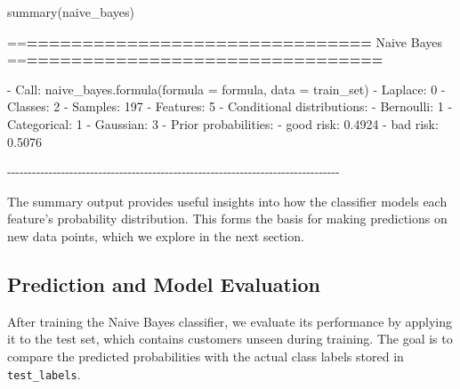 \documentclass[
  11pt,
]{book}
\makeatletter
\newenvironment{Shaded}{}{}
\newcommand{\AttributeTok}[1]{#1}
\newcommand{\DecValTok}[1]{#1}
\newcommand{\ErrorTok}[1]{\textcolor[rgb]{0.21,0.21,0.21}{\textbf{#1}}}
\newcommand{\FloatTok}[1]{#1}
\newcommand{\FunctionTok}[1]{#1}
\newcommand{\NormalTok}[1]{#1}
\newcommand{\SpecialCharTok}[1]{\textcolor[rgb]{0.39,0.39,0.39}{#1}}
\newenvironment{kframe}{%
\medskip{}
\setlength{\fboxsep}{.8em}
 \def\at@end@of@kframe{}%
 \ifinner\ifhmode%
  \def\at@end@of@kframe{\end{minipage}}%
  \begin{minipage}{\columnwidth}%
 \fi\fi%
 \def\FrameCommand##1{\hskip\@totalleftmargin \hskip-\fboxsep
 \colorbox{shadecolor}{##1}\hskip-\fboxsep
     \hskip-\linewidth \hskip-\@totalleftmargin \hskip\columnwidth}%
 \MakeFramed {\advance\hsize-\width
   \@totalleftmargin\z@ \linewidth\hsize
   \@setminipage}}%
 {\par\unskip\endMakeFramed%
 \at@end@of@kframe}
\renewenvironment{Shaded}{\begin{kframe}}{\end{kframe}}
\theoremstyle{definition}
\theoremstyle{definition}
\theoremstyle{definition}
\theoremstyle{definition}
\theoremstyle{remark}
\makeatother
\begin{document}
\begin{Shaded}
\begin{Highlighting}[]
\FunctionTok{summary}\NormalTok{(naive\_bayes)}
   
   \SpecialCharTok{==}\ErrorTok{===============================}\NormalTok{ Naive Bayes }\SpecialCharTok{==}\ErrorTok{================================} 
    
   \SpecialCharTok{{-}}\NormalTok{ Call}\SpecialCharTok{:} \FunctionTok{naive\_bayes.formula}\NormalTok{(}\AttributeTok{formula =}\NormalTok{ formula, }\AttributeTok{data =}\NormalTok{ train\_set) }
   \SpecialCharTok{{-}}\NormalTok{ Laplace}\SpecialCharTok{:} \DecValTok{0} 
   \SpecialCharTok{{-}}\NormalTok{ Classes}\SpecialCharTok{:} \DecValTok{2} 
   \SpecialCharTok{{-}}\NormalTok{ Samples}\SpecialCharTok{:} \DecValTok{197} 
   \SpecialCharTok{{-}}\NormalTok{ Features}\SpecialCharTok{:} \DecValTok{5} 
   \SpecialCharTok{{-}}\NormalTok{ Conditional distributions}\SpecialCharTok{:} 
       \SpecialCharTok{{-}}\NormalTok{ Bernoulli}\SpecialCharTok{:} \DecValTok{1}
       \SpecialCharTok{{-}}\NormalTok{ Categorical}\SpecialCharTok{:} \DecValTok{1}
       \SpecialCharTok{{-}}\NormalTok{ Gaussian}\SpecialCharTok{:} \DecValTok{3}
   \SpecialCharTok{{-}}\NormalTok{ Prior probabilities}\SpecialCharTok{:} 
       \SpecialCharTok{{-}}\NormalTok{ good risk}\SpecialCharTok{:} \FloatTok{0.4924}
       \SpecialCharTok{{-}}\NormalTok{ bad risk}\SpecialCharTok{:} \FloatTok{0.5076}
   
   \SpecialCharTok{{-}{-}{-}{-}{-}{-}{-}{-}{-}{-}{-}{-}{-}{-}{-}{-}{-}{-}{-}{-}{-}{-}{-}{-}{-}{-}{-}{-}{-}{-}{-}{-}{-}{-}{-}{-}{-}{-}{-}{-}{-}{-}{-}{-}{-}{-}{-}{-}{-}{-}{-}{-}{-}{-}{-}{-}{-}{-}{-}{-}{-}{-}{-}{-}{-}{-}{-}{-}{-}{-}{-}{-}{-}{-}{-}{-}{-}{-}{-}{-}}
\end{Highlighting}
\end{Shaded}

The summary output provides useful insights into how the classifier models each feature's probability distribution. This forms the basis for making predictions on new data points, which we explore in the next section.

\subsection*{Prediction and Model Evaluation}\label{prediction-and-model-evaluation}


After training the Naive Bayes classifier, we evaluate its performance by applying it to the test set, which contains customers unseen during training. The goal is to compare the predicted probabilities with the actual class labels stored in \texttt{test\_labels}.
\end{document}
